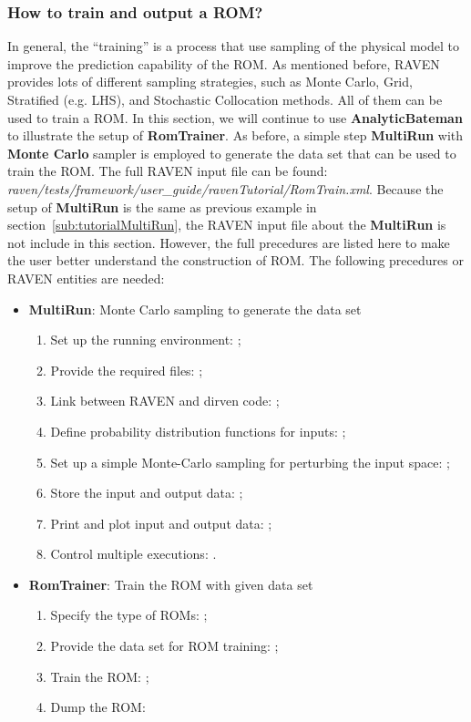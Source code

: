 \subsubsection{How to train and output a ROM?}
In general, the ``training'' is a process that use sampling of the physical model to improve the prediction
capability of the ROM. As mentioned before, RAVEN provides lots of different sampling strategies, such as Monte
Carlo, Grid, Stratified (e.g. LHS), and Stochastic Collocation methods. All of them can be used to train a ROM.
In this section, we will continue to use \textbf{AnalyticBateman} to illustrate the setup of \textbf{RomTrainer}.
As before, a simple step \textbf{MultiRun} with \textbf{Monte Carlo} sampler is employed to generate the data set
that can be used to train the ROM. The full RAVEN input file can be found:
\textit{raven/tests/framework/user\_guide/ravenTutorial/RomTrain.xml}.
Because the setup of \textbf{MultiRun} is the same as previous example in section~\ref{sub:tutorialMultiRun}, the
RAVEN input file about the \textbf{MultiRun} is not include in this section. However, the full precedures are
listed here to make the user better understand the construction of ROM. The following precedures or RAVEN entities
are needed:

\begin{itemize}
  \item \textbf{MultiRun}: Monte Carlo sampling to generate the data set
  \begin{enumerate}
    \item Set up the running environment: ;
    \item Provide the required files: ;
    \item Link between RAVEN and dirven code: ;
    \item Define probability distribution functions for inputs: ;
    \item Set up a simple Monte-Carlo sampling for perturbing the input space: ;
    \item Store the input and output data: ;
    \item Print and plot input and output data: ;
    \item Control multiple executions: .
  \end{enumerate}
  \item \textbf{RomTrainer}: Train the ROM with given data set
  \begin{enumerate}
    \item Specify the type of ROMs: ;
    \item Provide the data set for ROM training: ;
    \item Train the ROM: ;
    \item Dump the ROM: 
  \end{enumerate}
\end{itemize}

